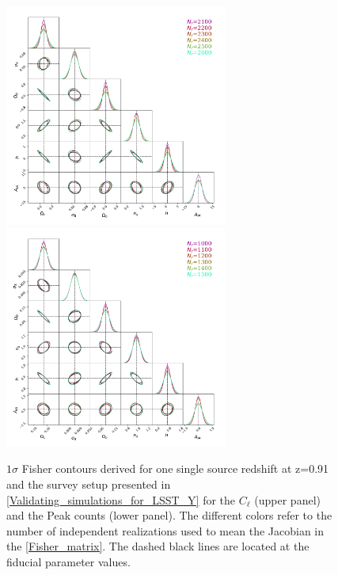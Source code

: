 \documentclass{aa}
\begin{document}
\begin{appendix}
\renewcommand{\thefigure}{B\arabic{figure}}
\setcounter{figure}{0}
 \begin{figure}
    \centering
        \includegraphics[width=0.65\textwidth]{paper/figures/Fisher_stability_ps_new.pdf}
        \includegraphics[width=0.65\textwidth]{paper/figures/Fisher_stability_peak_1sigma_new.pdf}
    \caption{ $1\sigma$ Fisher contours derived for one single source redshift at z=0.91 and the survey setup presented in \autoref{Validating_simulations_for_LSST_Y} for the $C_{\ell}$ (upper panel) and the Peak counts (lower panel). The different colors refer to the number of independent realizations used to mean the Jacobian in the \autoref{Fisher_matrix}. The dashed black lines are located at the fiducial parameter values.}
     \label{fig:Fisher_stab}
\end{figure}




\end{appendix}
\end{document}
